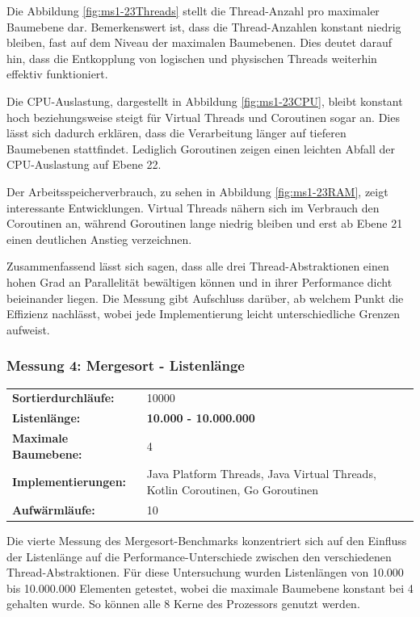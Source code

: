 \documentclass[fontsize=12pt,paper=a4,twoside=semi,parskip=half-,headsepline,headinclude]{scrreprt}
\begin{document}
Die Abbildung \ref{fig:ms1-23Threads} stellt die Thread-Anzahl pro maximaler Baumebene dar. Bemerkenswert ist, dass die Thread-Anzahlen konstant niedrig bleiben, fast auf dem Niveau der maximalen Baumebenen. Dies deutet darauf hin, dass die Entkopplung von logischen und physischen Threads weiterhin effektiv funktioniert.

Die CPU-Auslastung, dargestellt in Abbildung \ref{fig:ms1-23CPU}, bleibt konstant hoch beziehungsweise steigt für Virtual Threads und Coroutinen sogar an. Dies lässt sich dadurch erklären, dass die Verarbeitung länger auf tieferen Baumebenen stattfindet. Lediglich Goroutinen zeigen einen leichten Abfall der CPU-Auslastung auf Ebene 22.

Der Arbeitsspeicherverbrauch, zu sehen in Abbildung \ref{fig:ms1-23RAM}, zeigt interessante Entwicklungen. Virtual Threads nähern sich im Verbrauch den Coroutinen an, während Goroutinen lange niedrig bleiben und erst ab Ebene 21 einen deutlichen Anstieg verzeichnen.

Zusammenfassend lässt sich sagen, dass alle drei Thread-Abstraktionen einen hohen Grad an Parallelität bewältigen können und in ihrer Performance dicht beieinander liegen. Die Messung gibt Aufschluss darüber, ab welchem Punkt die Effizienz nachlässt, wobei jede Implementierung leicht unterschiedliche Grenzen aufweist.

\subsubsection{Messung 4: Mergesort - Listenlänge}

\begin{tabularx}{\textwidth}{@{}lX@{}}
	\textbf{Sortierdurchläufe:} & 10000 \\
	\textbf{Listenlänge:} & \textbf{10.000 - 10.000.000} \\
	\textbf{Maximale Baumebene:} & 4 \\
	\textbf{Implementierungen:} & Java Platform Threads, Java Virtual Threads, Kotlin Coroutinen, Go Goroutinen \\
	\textbf{Aufwärmläufe:} & 10
\end{tabularx}

Die vierte Messung des Mergesort-Benchmarks konzentriert sich auf den Einfluss der Listenlänge auf die Performance-Unterschiede zwischen den verschiedenen Thread-Abs\-trak\-ti\-onen. Für diese Untersuchung wurden Listenlängen von 10.000 bis 10.000.000 Elementen getestet, wobei die maximale Baumebene konstant bei 4 gehalten wurde. So können alle 8 Kerne des Prozessors genutzt werden.
\end{document}
